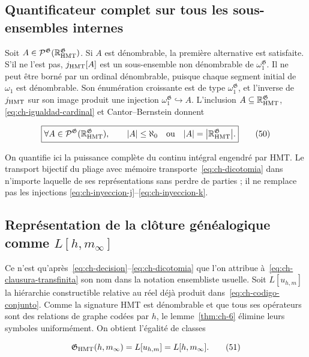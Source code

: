 \subsection{Quantificateur complet sur tous les sous-ensembles internes}

Soit
\(A\in\mathcal P^{\mathfrak G}
(\mathbb R_{\rm HMT}^{\mathfrak G})\). Si \(A\) est dénombrable, la
première alternative est satisfaite. S’il ne l’est pas, \(j_{\rm HMT}[A]\) est un sous-ensemble non
dénombrable de \(\omega_1^{\mathfrak G}\). Il ne peut être borné par un ordinal
dénombrable, puisque chaque segment initial de \(\omega_1\) est dénombrable. Son
énumération croissante est de type \(\omega_1^{\mathfrak G}\), et l’inverse de
\(j_{\rm HMT}\) sur son image produit une injection
\(\omega_1^{\mathfrak G}\hookrightarrow A\). L’inclusion
\(A\subseteq\mathbb R_{\rm HMT}^{\mathfrak G}\), \eqref{eq:ch-igualdad-cardinal} et
Cantor--Bernstein donnent

\[
 \boxed{
 \forall A\in\mathcal P^{\mathfrak G}
   (\mathbb R_{\rm HMT}^{\mathfrak G}),\qquad
 |A|\le\aleph_0
 \quad\text{ou}\quad
 |A|=\bigl|\mathbb R_{\rm HMT}^{\mathfrak G}\bigr|.}
\tag{50}\label{eq:ch-dicotomia}
\]

On quantifie ici la puissance complète du continu intégral engendré par
HMT. Le transport bijectif du pliage avec mémoire transporte~\eqref{eq:ch-dicotomia} dans n’importe laquelle
de ses représentations sans perdre de parties ; il ne remplace pas les injections
\eqref{eq:ch-inyeccion-j}--\eqref{eq:ch-inyeccion-k}.

\subsection{Représentation de la clôture généalogique comme \texorpdfstring{\(L[h,m_\infty]\)}{L[h,m-infinito]}}

Ce n'est qu'après~\eqref{eq:ch-decision}--\eqref{eq:ch-dicotomia} que l'on attribue à~\eqref{eq:ch-clausura-transfinita} son nom dans la notation ensembliste usuelle. Soit \(L[u_{h,m}]\) la hiérarchie constructible relative au réel déjà produit dans~\eqref{eq:ch-codigo-conjunto}. Comme la signature HMT est dénombrable et que tous ses opérateurs sont des relations de graphe codées par \(h\), le lemme~\ref{thm:ch-6} élimine leurs symboles uniformément. On obtient l'égalité de classes

\[
 \mathfrak G_{\rm HMT}(h,m_\infty)
 =L[u_{h,m}]=L[h,m_\infty].
\tag{51}\label{eq:ch-representacion-L}
\]

